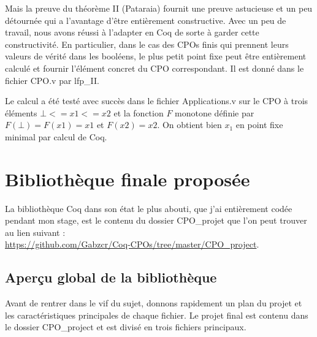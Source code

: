 \documentclass{article}
\newcommand\code[1]{{\fontfamily{lmtt}\selectfont #1}}
\theoremstyle{definition}
\begin{document}
Mais la preuve du théorème II (Pataraia) fournit une preuve astucieuse et un peu détournée qui a l'avantage d'être entièrement constructive. Avec un peu de travail, nous avons réussi à l'adapter en Coq de sorte à garder cette constructivité. En particulier, dans le cas des CPOs finis qui prennent leurs valeurs de vérité dans les booléens, le plus petit point fixe peut être entièrement calculé et fournir l'élément concret du CPO correspondant. Il est donné dans le fichier \code{CPO.v} par \code{lfp\_II}. 

Le calcul a été testé avec succès dans le fichier \code{Applications.v} sur le CPO à trois éléments $\bot <= x1 <= x2$ et la fonction $F$ monotone définie par $F(\bot) = F(x1) = x1$ et $F(x2) = x2$. On obtient bien $x_1$ en point fixe minimal par calcul de Coq.



\section{Bibliothèque finale proposée}

La bibliothèque Coq dans son état le plus abouti, que j'ai entièrement codée pendant mon stage, est le contenu du dossier \code{CPO\_projet} que l'on peut trouver au lien suivant :\\ \href{https://github.com/Gabzcr/Coq-CPOs/tree/master/CPO\_project}{https://github.com/Gabzcr/Coq-CPOs/tree/master/CPO\_project}.

\subsection{Aperçu global de la bibliothèque}

Avant de rentrer dans le vif du sujet, donnons rapidement un plan du projet et les caractéristiques principales de chaque fichier. Le projet final est contenu dans le dossier \code{CPO\_project} et est divisé en trois fichiers principaux.

\medskip
\end{document}
